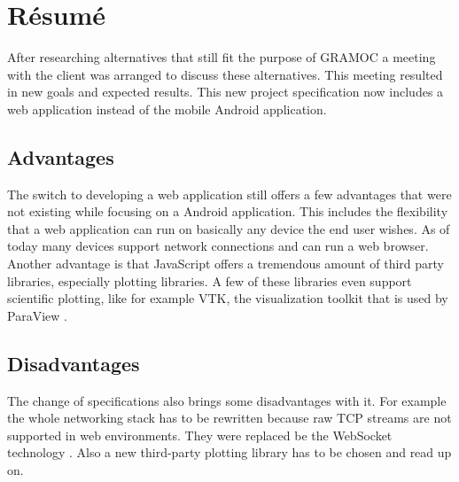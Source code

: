 \chapter{Résumé}

\author{Nico Kratky}
%
After researching alternatives that still fit the purpose of GRAMOC a meeting with the client was arranged to discuss these alternatives. This meeting resulted in new goals and expected results. This new project specification now includes a web application instead of the mobile Android application.

\section{Advantages}
The switch to developing a web application still offers a few advantages that were not existing while focusing on a Android application. This includes the flexibility that a web application can run on basically any device the end user wishes. As of today many devices support network connections and can run a web browser. Another advantage is that JavaScript offers a tremendous amount of third party libraries, especially plotting libraries. A few of these libraries even support scientific plotting, like for example VTK, the visualization toolkit that is used by ParaView \autocite{VTK}.

\section{Disadvantages}
The change of specifications also brings some disadvantages with it. For example the whole networking stack has to be rewritten because raw TCP streams are not supported in web environments. They were replaced be the WebSocket technology \autocite{rfc6455}. Also a new third-party plotting library has to be chosen and read up on.
